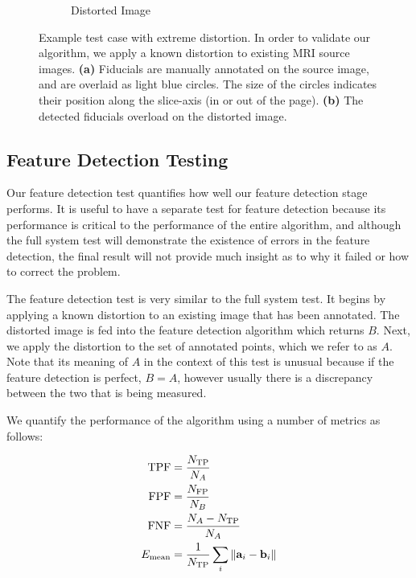\documentclass[12pt]{article}
\begin{document}
\begin{figure}
\begin{subfigure}[b]{0.48\textwidth}
        \caption{Distorted Image}
        \label{fig:test-case_2}
    \end{subfigure}
    \caption{Example test case with extreme distortion.  In order to validate our algorithm, we apply a known distortion to existing MRI source images. \textbf{(a)} Fiducials are manually annotated on the source image, and are overlaid as light blue circles.  The size of the circles indicates their position along the slice-axis (in or out of the page).  \textbf{(b)} The detected fiducials overload on the distorted image.}
    \label{fig:test-case}
\end{figure}

\subsection{Feature Detection Testing}

Our feature detection test quantifies how well our feature detection stage performs.  It is useful to have a separate test for feature detection because its performance is critical to the performance of the entire algorithm, and although the full system test will demonstrate the existence of errors in the feature detection, the final result will not provide much insight as to why it failed or how to correct the problem.

The feature detection test is very similar to the full system test.  It begins by applying a known distortion to an existing image that has been annotated.  The distorted image is fed into the feature detection algorithm which returns $B$.  Next, we apply the distortion to the set of annotated points, which we refer to as $A$.  Note that its meaning of $A$ in the context of this test is unusual because if the feature detection is perfect, $B = A$, however usually there is a discrepancy between the two that is being measured.

We quantify the performance of the algorithm using a number of metrics as follows:

$$
\begin{align*}
    \textrm{TPF} &= \frac{N_\textrm{TP}}{N_A} \\
    \textrm{FPF} &= \frac{N_\textrm{FP}}{N_B} \\
    \textrm{FNF} &= \frac{N_A - N_\textrm{TP}}{N_A} \\
    E_\textrm{mean} &= \frac{1}{N_\textrm{TP}} \sum_i \| \textbf{a}_i - \textbf{b}_i \|\\
\end{align*} \\
$$
\end{document}
